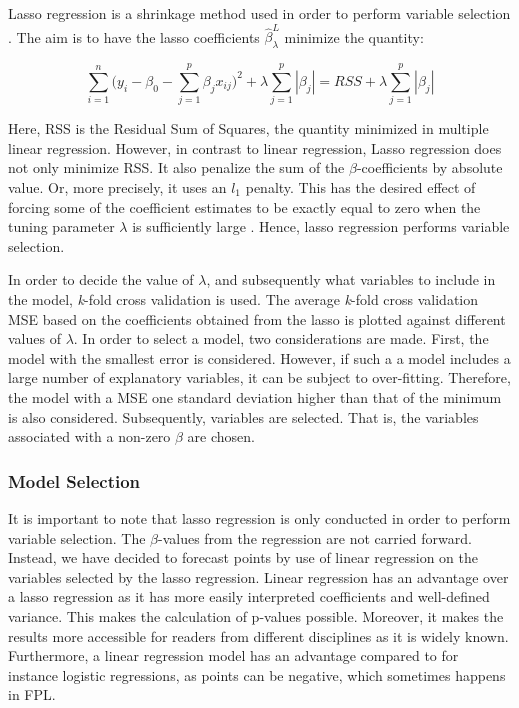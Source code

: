 Lasso regression is a shrinkage method used in order to perform variable selection \citep{ISLR}. The aim is to have the lasso coefficients $\hat{\beta}_{\lambda}^{L}$ minimize the quantity:

\begin{equation*}
    \sum_{i=1}^n\Big (y_i-\beta_0-\sum_{j=1}^p\beta_jx_{ij}\Big)^2 + \lambda \sum_{j=1}^p|\beta_j| = RSS + \lambda \sum_{j=1}^p|\beta_j|
\end{equation*}

Here, RSS is the Residual Sum of Squares, the quantity minimized in multiple linear regression. However, in contrast to linear regression, Lasso regression does not only minimize RSS. It also penalize the sum of the $\beta$-coefficients by absolute value. Or, more precisely, it uses an $l_1$ penalty. This has the desired effect of forcing some of the coefficient estimates to be exactly equal to zero when the tuning parameter $\lambda$ is sufficiently large \citep{ISLR}. Hence, lasso regression performs variable selection.\newpar 

In order to decide the value of $\lambda$, and subsequently what variables to include in the model, \textit{k}-fold cross validation is used. The average \textit{k}-fold cross validation MSE based on the coefficients obtained from the lasso is plotted against different values of $\lambda$. In order to select a model, two considerations are made. First, the model with the smallest error is considered. However, if such a a model includes a large number of explanatory variables, it can be subject to over-fitting. Therefore, the model with a MSE one standard deviation higher than that of the minimum is also considered. Subsequently, variables are selected. That is, the variables associated with a non-zero $\beta$ are chosen. 

\subsubsection{Model Selection}

It is important to note that lasso regression is only conducted in order to perform variable selection. The $\beta$-values from the regression are not carried forward. Instead, we have decided to forecast points by use of linear regression on the variables selected by the lasso regression. Linear regression has an advantage over a lasso regression as it has more easily interpreted coefficients and well-defined variance. This makes the calculation of p-values possible. Moreover, it makes the results more accessible for readers from different disciplines as it is widely known. Furthermore, a linear regression model has an advantage compared to for instance logistic regressions, as points can be negative, which sometimes happens in FPL.\newpar 

